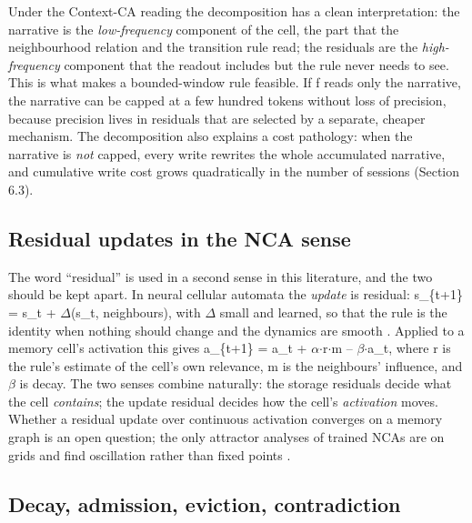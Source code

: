 \documentclass[11pt]{article}
\begin{document}
Under the Context-CA reading the decomposition has a clean interpretation: the narrative is the \emph{low-frequency} component of the cell, the part that the neighbourhood relation and the transition rule read; the residuals are the \emph{high-frequency} component that the readout includes but the rule never needs to see. This is what makes a bounded-window rule feasible. If f reads only the narrative, the narrative can be capped at a few hundred tokens without loss of precision, because precision lives in residuals that are selected by a separate, cheaper mechanism. The decomposition also explains a cost pathology: when the narrative is \emph{not} capped, every write rewrites the whole accumulated narrative, and cumulative write cost grows quadratically in the number of sessions (Section 6.3).

\subsection{Residual updates in the NCA sense}

The word ``residual'' is used in a second sense in this literature, and the two should be kept apart. In neural cellular automata the \emph{update} is residual: s\_\{t+1\} = s\_t + $\Delta$(s\_t, neighbours), with $\Delta$ small and learned, so that the rule is the identity when nothing should change and the dynamics are smooth \cite{nca}. Applied to a memory cell's activation this gives a\_\{t+1\} = a\_t + $\alpha$$\cdot$r$\cdot$m -- $\beta$$\cdot$a\_t, where r is the rule's estimate of the cell's own relevance, m is the neighbours' influence, and $\beta$ is decay. The two senses combine naturally: the storage residuals decide what the cell \emph{contains}; the update residual decides how the cell's \emph{activation} moves. Whether a residual update over continuous activation converges on a memory graph is an open question; the only attractor analyses of trained NCAs are on grids and find oscillation rather than fixed points \cite{nca-attractors,nca-landscape}.

\subsection{Decay, admission, eviction, contradiction}
\end{document}
